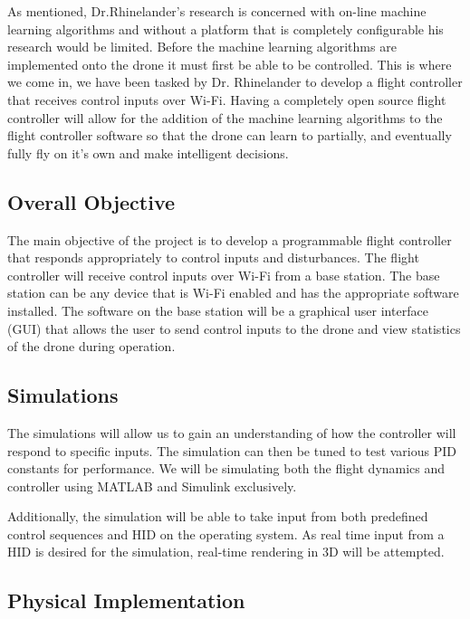 As mentioned, Dr.Rhinelander's research is concerned with on-line machine learning algorithms and without a platform that is completely configurable his research would be limited. Before the machine learning algorithms are implemented onto the drone it must first be able to be controlled. This is where we come in, we have been tasked by Dr. Rhinelander to develop a flight controller that receives control inputs over Wi-Fi. Having a completely open source flight controller will allow for the addition of the machine learning algorithms to the flight controller software so that the drone can learn to partially, and eventually fully fly on it's own and make intelligent decisions.

\subsection{Overall Objective}

The main objective of the project is to develop a programmable flight controller that responds appropriately to control inputs and disturbances. The flight controller will receive control inputs over Wi-Fi from a base station. The base station can be any device that is Wi-Fi enabled and has the appropriate software installed. The software on the base station will be a graphical user interface (GUI) that allows the user to send control inputs to the drone and view statistics of the drone during operation.


\subsection{Simulations}

The simulations will allow us to gain an understanding of how the controller will respond to specific inputs. The simulation can then be tuned to test various PID constants for performance. We will be simulating both the flight dynamics and controller using MATLAB and Simulink exclusively.  

Additionally, the simulation will be able to take input from both predefined control sequences and HID on the operating system.  As real time input from a HID is desired for the simulation, real-time rendering in 3D will be attempted.



\subsection{Physical Implementation}


